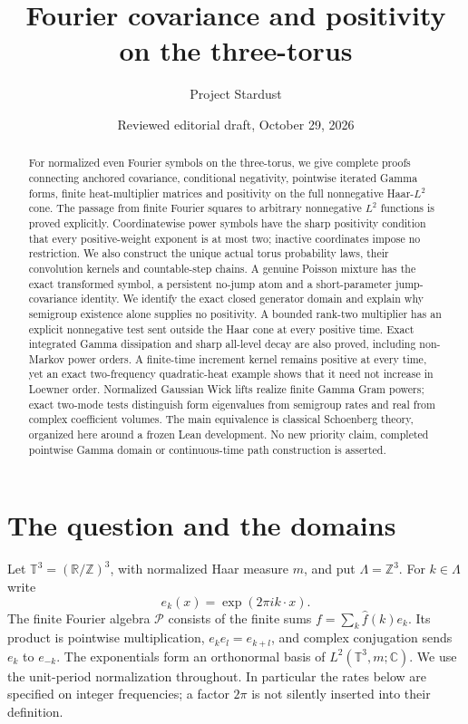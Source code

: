 \documentclass[11pt]{article}
\title{Fourier covariance and positivity on the three-torus}
\author{Project Stardust}
\date{Reviewed editorial draft, October 29, 2026}
\theoremstyle{remark}\newtheorem{remark}[theorem]{Remark}
\newcommand{\R}{\mathbb R}\newcommand{\C}{\mathbb C}
\newcommand{\Z}{\mathbb Z}\newcommand{\T}{\mathbb T}
\begin{document}
\maketitle
\begin{abstract}
For normalized even Fourier symbols on the three-torus, we give
complete proofs connecting anchored covariance, conditional
negativity, pointwise iterated Gamma forms, finite heat-multiplier
matrices and positivity on the full nonnegative Haar-$L^2$ cone.
The passage from finite Fourier squares to arbitrary nonnegative
$L^2$ functions is proved explicitly. Coordinatewise power symbols
have the sharp positivity condition that every positive-weight
exponent is at most two; inactive coordinates impose no restriction.
We also construct the unique actual torus probability laws, their convolution kernels and countable-step chains. A genuine Poisson mixture has the exact transformed symbol, a persistent no-jump atom and a short-parameter jump-covariance identity. We identify the exact closed generator domain and explain why
semigroup existence alone supplies no positivity. A bounded rank-two
multiplier has an explicit nonnegative test sent outside the Haar cone
at every positive time. Exact integrated Gamma dissipation and sharp
all-level decay are also proved, including non-Markov power orders. A finite-time
increment kernel remains positive at every time, yet an exact
two-frequency quadratic-heat example shows that it need not increase
in Loewner order. Normalized Gaussian Wick lifts realize finite Gamma Gram
powers; exact two-mode tests distinguish form eigenvalues from semigroup
rates and real from complex coefficient volumes. The main equivalence is classical Schoenberg
theory, organized here around a frozen Lean development. No new
priority claim, completed pointwise Gamma domain or continuous-time
path construction is asserted.
\end{abstract}

\section{The question and the domains}
Let $\T^3=(\R/\Z)^3$, with normalized Haar measure $m$, and put
$\Lambda=\Z^3$. For $k\in\Lambda$ write
\[
 e_k(x)=\exp(2\pi i k\cdot x).
\]
The finite Fourier algebra $\mathcal P$ consists of the finite sums
$f=\sum_k\widehat f(k)e_k$. Its product is pointwise multiplication,
$e_ke_l=e_{k+l}$, and complex conjugation sends $e_k$ to $e_{-k}$.
The exponentials form an orthonormal basis of $L^2(\T^3,m;\C)$.
We use the unit-period normalization throughout. In particular the
rates below are specified on integer frequencies; a factor $2\pi$
is not silently inserted into their definition.
\end{document}
